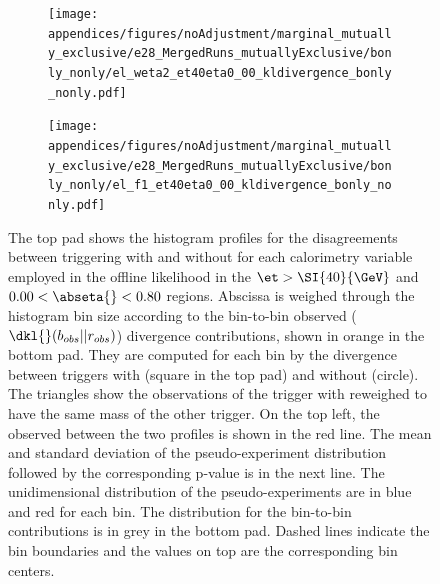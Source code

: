 \begin{figure}[t]\ContinuedFloat
\begin{center}
\hspace*{\fill}
\begin{subfigure}[c]{.48\textwidth}
\centering
\texttt{[image: appendices/figures/noAdjustment/marginal\_mutually\_exclusive/e28\_MergedRuns\_mutuallyExclusive/bonly\_nonly/el\_weta2\_et40eta0\_00\_kldivergence\_bonly\_nonly.pdf]}
\caption{}%
\label{fig:pseudo_weta}
\end{subfigure}
\hspace*{\fill} 
\begin{subfigure}[c]{.48\textwidth}
\centering
\texttt{[image: appendices/figures/noAdjustment/marginal\_mutually\_exclusive/e28\_MergedRuns\_mutuallyExclusive/bonly\_nonly/el\_f1\_et40eta0\_00\_kldivergence\_bonly\_nonly.pdf]}
\caption{}%
\label{fig:pseudo_f1}
\end{subfigure}
\hfill
\caption{The top pad shows the histogram profiles for the disagreements between
  triggering with and without \rnn{} for each calorimetry
  variable\footnotemark{} employed in the offline likelihood in the
  $\et>\SI{40}{\GeV}$ and $0.00<\abseta{}<0.80$ regions. Abscissa is weighed
  through the histogram bin size according to the bin-to-bin observed
  ($\dkl{}(b_{obs}||r_{obs})$) divergence contributions, shown in orange in the
  bottom pad. They are computed for each bin by the divergence between triggers
  with \rnn{} (square in the top pad) and without (circle). The triangles show
  the observations of the trigger with \rnn{} reweighed to have the same mass of
  the other trigger.  On the top left, the observed \dkl{} between the two
  profiles is shown in the red line.  The mean and standard deviation of the
  pseudo-experiment \dkl{} distribution followed by the corresponding p-value is
  in the next line. The unidimensional distribution of the pseudo-experiments
  are in blue and red for each bin. The distribution for the bin-to-bin \dkl{}
  contributions is in grey in the bottom pad. Dashed lines indicate the bin
  boundaries and the values on top are the corresponding bin centers.}%
\label{fig:pseudo_calo}
\end{center}
\end{figure}


\FloatBarrier
